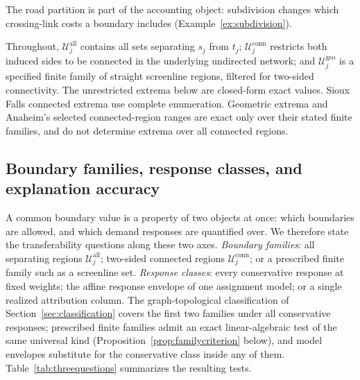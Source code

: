 \documentclass[a4paper,fleqn]{cas-sc}
\begin{document}
The road partition is part of the accounting object: subdivision changes
which crossing-link costs a boundary includes (Example~\ref{ex:subdivision}).

Throughout, $\mathcal U_j^{\mathrm{all}}$ contains all sets separating
$s_j$ from $t_j$; $\mathcal U_j^{\mathrm{conn}}$ restricts both induced sides
to be connected in the underlying undirected network; and
$\mathcal U_j^{\mathrm{geo}}$ is a specified finite family of straight
screenline regions, filtered for two-sided connectivity.
The unrestricted extrema below are closed-form exact values. Sioux Falls
connected extrema use complete enumeration. Geometric extrema and Anaheim's
selected connected-region ranges are exact only over their stated finite
families, and do not determine extrema over all connected regions.

\subsection{Boundary families, response classes, and explanation accuracy}\label{sec:levels}\label{sec:hierarchy}
A common boundary value is a property of two objects at once: which
boundaries are allowed, and which demand responses are quantified over.
We therefore state the transferability questions along these two axes.
\emph{Boundary families}: all separating regions
$\mathcal U_j^{\mathrm{all}}$; two-sided connected regions
$\mathcal U_j^{\mathrm{conn}}$; or a prescribed finite family such as a
screenline set. \emph{Response classes}: every conservative response at
fixed weights; the affine response envelope of one assignment model;
or a single realized attribution column. The graph-topological
classification of Section~\ref{sec:classification} covers the first two
families under all conservative responses; prescribed finite families
admit an exact linear-algebraic test of the same universal kind
(Proposition~\ref{prop:familycriterion} below), and model envelopes
substitute for the conservative class inside any of them.
Table~\ref{tab:threequestions} summarizes the resulting tests.
\end{document}

